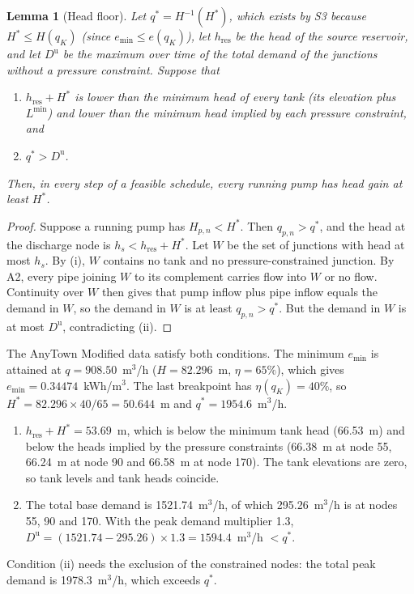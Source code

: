 \documentclass[11pt]{article}
\newtheorem{lemma}{Lemma}
\theoremstyle{remark}
\newcommand{\emin}{e_{\min}}
\newcommand{\Lmin}{L^{\min}}
\newcommand{\hres}{h_{\mathrm{res}}}
\newcommand{\Du}{D^{\mathrm{u}}}
\begin{document}
\begin{lemma}[Head floor]\label{lem:head}
Let $q^* = H^{-1}(H^*)$, which exists by S3 because $H^* \le H(q_K)$ (since
$\emin \le e(q_K)$), let $\hres$ be the head of the source reservoir, and let $\Du$ be the
maximum over time of the total demand of the junctions without a pressure constraint.
Suppose that
\begin{enumerate}
  \item[(i)] $\hres + H^*$ is lower than the minimum head of every tank (its elevation plus
    $\Lmin$) and lower than the minimum head implied by each pressure constraint, and
  \item[(ii)] $q^* > \Du$.
\end{enumerate}
Then, in every step of a feasible schedule, every running pump has head gain at least
$H^*$.
\end{lemma}

\begin{proof}
Suppose a running pump has $H_{p,n} < H^*$. Then $q_{p,n} > q^*$, and the head at the
discharge node is $h_s < \hres + H^*$. Let $W$ be the set of junctions with head at most
$h_s$. By (i), $W$ contains no tank and no pressure-constrained junction. By A2, every
pipe joining $W$ to its complement carries flow into $W$ or no flow. Continuity over $W$
then gives that pump inflow plus pipe inflow equals the demand in $W$, so the demand in
$W$ is at least $q_{p,n} > q^*$. But the demand in $W$ is at most $\Du$, contradicting
(ii).
\end{proof}

The AnyTown Modified data satisfy both conditions. The minimum $\emin$ is attained at
$q = 908.50$~m$^3$/h ($H = 82.296$~m, $\eta = 65\%$), which gives
$\emin = 0.34474$~kWh/m$^3$. The last breakpoint has $\eta(q_K) = 40\%$, so
$H^* = 82.296 \times 40/65 = 50.644$~m and $q^* = 1954.6$~m$^3$/h.
\begin{enumerate}
  \item[(i)] $\hres + H^* = 53.69$~m, which is below the minimum tank head (66.53~m) and
    below the heads implied by the pressure constraints (66.38~m at node 55, 66.24~m at
    node 90 and 66.58~m at node 170). The tank elevations are zero, so tank levels and
    tank heads coincide.
  \item[(ii)] The total base demand is 1521.74~m$^3$/h, of which 295.26~m$^3$/h is at
    nodes 55, 90 and 170. With the peak demand multiplier 1.3,
    $\Du = (1521.74 - 295.26) \times 1.3 = 1594.4$~m$^3$/h $< q^*$.
\end{enumerate}
Condition (ii) needs the exclusion of the constrained nodes: the total peak demand is
1978.3~m$^3$/h, which exceeds $q^*$.
\end{document}
